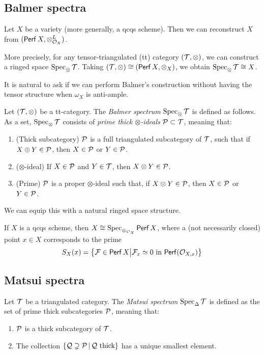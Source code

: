 \documentclass{amsart}
\begin{document}
\subsection{Balmer spectra}

\begin{thm}[Balmer]
	Let $X$ be a variety (more generally, a qcqs scheme).
	Then we can reconstruct $X$ from $(\mathsf{Perf}\, X, \otimes_{\mathcal{O}_X}^L)$.
	
	More precisely, for any tensor-triangulated (tt) category $(\mathcal{T}, \otimes)$, we can construct a ringed space $\operatorname{Spec}_\otimes \mathcal{T}$.
	Taking $(\mathcal{T}, \otimes) \cong (\mathsf{Perf}\, X, \otimes_X)$, we obtain $\operatorname{Spec}_\otimes \mathcal{T} \cong X$.
\end{thm}

It is natural to ask if we can perform Balmer's construction without having the tensor structure when $\omega_X$ is anti-ample.


\begin{dfn}[Balmer]
	Let $(\mathcal{T}, \otimes)$ be a tt-category.
	The \emph{Balmer spectrum} $\operatorname{Spec}_\otimes \mathcal{T}$ is defined as follows.
	As a set, $\operatorname{Spec}_\otimes \mathcal{T}$ consists of \emph{prime thick $\otimes$-ideals} $\mathcal{P} \subset \mathcal{T}$, meaning that:
	\begin{enumerate}
		\item (Thick subcategory) $\mathcal{P}$ is a full triangulated subcategory of $\mathcal{T}$, such that if $X \oplus Y \in \mathcal{P}$, then $X \in \mathcal{P}$ or $Y \in \mathcal{P}$.
		\item ($\otimes$-ideal) If $X \in \mathcal{P}$ and $Y \in \mathcal{T}$, then $X \otimes Y \in \mathcal{P}$.
		\item (Prime) $\mathcal{P}$ is a proper $\otimes$-ideal such that, if $X \otimes Y \in \mathcal{P}$, then $X \in \mathcal{P}$ or $Y \in \mathcal{P}$.
	\end{enumerate}
	We can equip this with a natural ringed space structure.
\end{dfn}

\begin{ex}
	If $X$ is a qcqs scheme, then $X \cong \operatorname{Spec}_{\otimes_{\mathcal{O}_X}} \mathsf{Perf}\, X$, where a (not necessarily closed) point $x \in X$ corresponds to the prime
	\[
		S_X(x) = \big\{ \mathcal{F} \in \mathsf{Perf}\, X \big| \mathcal{F}_x \simeq 0 \textrm{ in } \mathsf{Perf}(\mathcal{O}_{X,x}) \big\}
	\]
\end{ex}

\subsection{Matsui spectra}

\begin{dfn}[Matsui]
	Let $\mathcal{T}$ be a triangulated category.
	The \emph{Matsui spectrum} $\operatorname{Spec}_\Delta \mathcal{T}$ is defined as the set of prime thick subcategories $\mathcal{P}$, meaning that:
	\begin{enumerate}
		\item $\mathcal{P}$ is a thick subcategory of $\mathcal{T}$.
		\item The collection $\{ \mathcal{Q} \supsetneq \mathcal{P} \,|\, \mathcal{Q} \textrm{ thick}\}$ has a unique smallest element.
	\end{enumerate}
\end{dfn}
\end{document}
